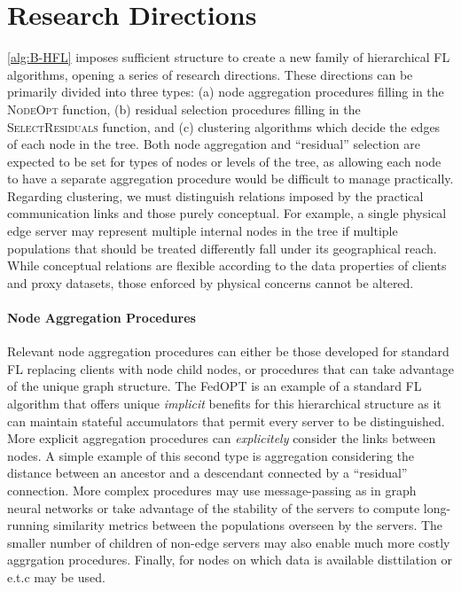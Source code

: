 \section{Research Directions}\label{sec:proposal:research_directions}
\cref{alg:B-HFL} imposes sufficient structure to create a new family of hierarchical FL algorithms, opening a series of research directions. These directions can be primarily divided into three types: (a) node aggregation procedures filling in the \textsc{NodeOpt} function, (b) residual selection procedures filling in the \textsc{SelectResiduals} function, and (c) clustering algorithms which decide the edges of each node in the tree. Both node aggregation and ``residual'' selection are expected to be set for types of nodes or levels of the tree, as allowing each node to have a separate aggregation procedure would be difficult to manage practically. Regarding clustering, we must distinguish relations imposed by the practical communication links and those purely conceptual. For example, a single physical edge server may represent multiple internal nodes in the tree if multiple populations that should be treated differently fall under its geographical reach. While conceptual relations are flexible according to the data properties
of clients and proxy datasets, those enforced by physical concerns cannot be altered.

\paragraph{Node Aggregation Procedures} Relevant node aggregation procedures can either be those developed for standard FL replacing clients with node child nodes, or procedures that can take advantage of the unique graph structure. The FedOPT is an example of a standard FL algorithm that offers unique \emph{implicit} benefits for this hierarchical structure as it can maintain stateful accumulators that permit every server to be distinguished. More explicit aggregation procedures can \emph{explicitely} consider the links between nodes. A simple example of this second type is aggregation considering the distance between an ancestor and a descendant connected by a ``residual'' connection. More complex procedures may use message-passing as in graph neural networks  or take advantage of the stability of the servers to compute long-running similarity metrics between the populations overseen by the servers. The smaller number of children of non-edge servers may also enable much more costly aggrgation procedures. Finally, for nodes on which data is available disttilation or e.t.c may be used.
